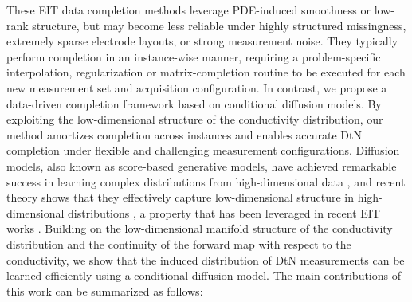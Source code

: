\documentclass{article}
\begin{document}
These EIT data completion methods \citep{harrach2015interpolation,hauptmann2017approximation,bui2022bridging} leverage PDE-induced smoothness or low-rank structure, but may become less reliable under highly structured missingness, extremely sparse electrode layouts, or strong measurement noise. They typically perform completion in an instance-wise manner, requiring a problem-specific interpolation, regularization or matrix-completion routine to be executed for each new measurement set and acquisition configuration. In contrast, we propose a data-driven completion framework based on conditional diffusion models. By exploiting the low-dimensional structure of the conductivity distribution, our method amortizes completion across instances and enables accurate DtN completion under flexible and challenging measurement configurations. Diffusion models, also known as score-based generative models, have achieved remarkable success in learning complex distributions from high-dimensional data \citep{song2020score, ho2020denoising}, and recent theory shows that they effectively capture low-dimensional structure in high-dimensional distributions \citep{tang2024conditional,azangulov2024convergence, liang2025low}, a property that has been leveraged in recent EIT works \citep{alberti2022inverse, alberti2024manifold}. Building on the low-dimensional manifold structure of the conductivity distribution and the continuity of the forward map with respect to the conductivity, we show that the induced distribution of DtN measurements can be learned efficiently using a conditional diffusion model. The main contributions of this work can be summarized as follows: 
\end{document}
